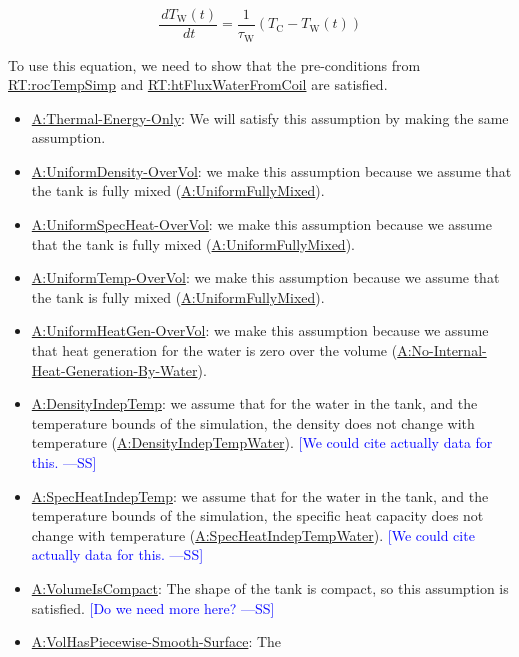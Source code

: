 \documentclass[12pt]{article}
\newcommand{\authornote}[3]{\textcolor{#1}{[#3 ---#2]}}
\newcommand{\authornote}[3]{}
\newcommand{\wss}[1]{\authornote{blue}{SS}{#1}}
\begin{document}
\begin{displaymath}
\frac{\,d{T_{\text{W}}}(t)}{\,dt}=\frac{1}{{τ_{\text{W}}}} \left({T_{\text{C}}}-{T_{\text{W}}(t)}\right)
\end{displaymath}

To use this equation, we need to show that the pre-conditions from
\hyperref[RT:rocTempSimp]{RT:rocTempSimp} and
\hyperref[RT:htFluxWaterFromCoil]{RT:htFluxWaterFromCoil} are satisfied.

\begin{itemize}
\item \hyperref[assumpTEO]{A:Thermal-Energy-Only}: We will satisfy this
assumption by making the same assumption.
\item \hyperref[assumpUnifDens]{A:UniformDensity-OverVol}: we make this
assumption because we assume that the tank is fully mixed
(\hyperref[assumpFullyMixed]{A:UniformFullyMixed}).
\item \hyperref[assumpUnifSpecHeat]{A:UniformSpecHeat-OverVol}: we make this
assumption because we assume that the tank is fully mixed
(\hyperref[assumpFullyMixed]{A:UniformFullyMixed}).
\item \hyperref[assumpUnifTemp]{A:UniformTemp-OverVol}: we make this assumption
because we assume that the tank is fully mixed
(\hyperref[assumpFullyMixed]{A:UniformFullyMixed}).
\item \hyperref[assumpUnifHeatGen]{A:UniformHeatGen-OverVol}: we make this
assumption because we assume that heat generation for the water is zero over the
volume (\hyperref[assumpNIHGBW]{A:No-Internal-Heat-Generation-By-Water}).
\item \hyperref[assumpDensIndepT]{A:DensityIndepTemp}: we assume that for the water in the tank, and the temperature bounds of the simulation, the density does not change with temperature (\hyperref[assumpDensIndepTWater]{A:DensityIndepTempWater}).  \wss{We could cite actually data for this.}
\item \hyperref[assumpSpecHeatIndepT]{A:SpecHeatIndepTemp}: we assume that for
the water in the tank, and the temperature bounds of the simulation, the
specific heat capacity does not change with temperature
(\hyperref[assumpSpecHeatIndepTWater]{A:SpecHeatIndepTempWater}).  \wss{We could
cite actually data for this.}
\item \hyperref[assumpVolCompact]{A:VolumeIsCompact}: The shape of the tank
is compact, so this assumption is satisfied.  \wss{Do we need more here?}
\item \hyperref[assumpPiecewiseSmooth]{A:VolHasPiecewise-Smooth-Surface}: The

\end{itemize}
\end{document}
